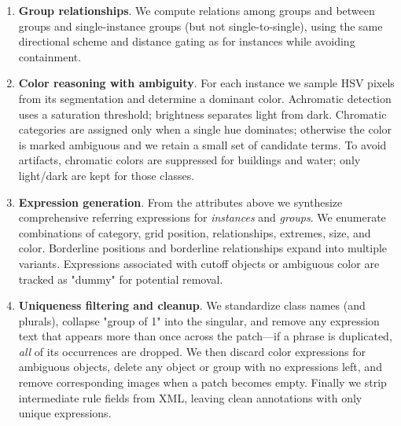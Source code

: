 \begin{enumerate}
    \item \textbf{Group relationships}. We compute relations among groups and between groups and single-instance groups (but not single-to-single), using the same directional scheme and distance gating as for instances while avoiding containment.
    \item \textbf{Color reasoning with ambiguity}. For each instance we sample HSV pixels from its segmentation and determine a dominant color. Achromatic detection uses a saturation threshold; brightness separates light from dark. Chromatic categories are assigned only when a single hue dominates; otherwise the color is marked ambiguous and we retain a small set of candidate terms. To avoid artifacts, chromatic colors are suppressed for buildings and water; only light/dark are kept for those classes.
    \item \textbf{Expression generation}. From the attributes above we synthesize comprehensive referring expressions for \emph{instances} and \emph{groups}. We enumerate combinations of category, grid position, relationships, extremes, size, and color. Borderline positions and borderline relationships expand into multiple variants. Expressions associated with cutoff objects or ambiguous color are tracked as "dummy" for potential removal.
    \item \textbf{Uniqueness filtering and cleanup}. We standardize class names (and plurals), collapse "group of 1" into the singular, and remove any expression text that appears more than once across the patch—if a phrase is duplicated, \emph{all} of its occurrences are dropped. We then discard color expressions for ambiguous objects, delete any object or group with no expressions left, and remove corresponding images when a patch becomes empty. Finally we strip intermediate rule fields from XML, leaving clean annotations with only unique expressions.
\end{enumerate}

